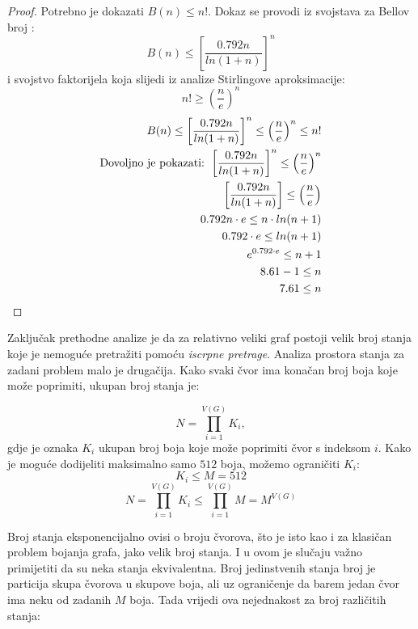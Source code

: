 \documentclass[times, utf8, diplomski, numeric]{fer}
\begin{document}
\begin{proof}
	Potrebno je dokazati $B(n) \le n!$. Dokaz se provodi iz svojstava za Bellov broj \cite{lit20}:
	\[ B(n) \le \left [ \frac{0.792 n}{ln(1+n)} \right ]^n \] 
	i svojstvo faktorijela koja slijedi iz analize Stirlingove aproksimacije: \[ n!\ge \left ( \frac{n}{e} \right )^n \]
	\begin{align}
		B(n) \le \left [ \frac{0.792 n}{ln(1+n)} \right ]^n \le \left ( \frac{n}{e} \right )^n \le n! \\
		\textup{Dovoljno je pokazati: } \left [ \frac{0.792 n}{ln(1+n)} \right ]^n \le \left ( \frac{n}{e} \right )^n \\
		\left [ \frac{0.792 n}{ln(1+n)} \right ] \le \left ( \frac{n}{e} \right ) \\
		0.792 n\cdot e \le n \cdot ln(n+1) \\
		0.792\cdot e \le ln(n+1) \\
		e^{0.792\cdot e} \le n+1 \\
		8.61 -1 \le n \\
		7.61 \le n
	\end{align}
\end{proof}

Zaključak prethodne analize je da za relativno veliki graf postoji velik broj stanja koje je nemoguće pretražiti pomoću \emph{iscrpne pretrage}. Analiza prostora stanja za zadani problem malo je drugačija. Kako svaki čvor ima konačan broj boja koje može poprimiti, ukupan broj stanja je:

\begin{equation}
N = \prod_{i=1}^{V(G)} K_i,
\end{equation}
gdje je oznaka $K_i$ ukupan broj boja koje može poprimiti čvor s indeksom $i$. Kako je moguće dodijeliti maksimalno samo $512$ boja, možemo ograničiti $K_i$:
\begin{equation}
K_i \le M = 512
\end{equation}
\begin{equation}
N = \prod_{i=1}^{V(G)} K_i \le \prod_{i=1}^{V(G)} M = M^{V(G)}
\end{equation}

Broj stanja eksponencijalno ovisi o broju čvorova, što je isto kao i za klasičan problem bojanja grafa, jako velik broj stanja. I u ovom je slučaju važno primijetiti da su neka stanja ekvivalentna. Broj jedinstvenih stanja broj je particija skupa čvorova u skupove boja, ali uz ograničenje da barem jedan čvor ima neku od zadanih $M$ boja. Tada vrijedi ova nejednakost za broj različitih stanja:
\end{document}
